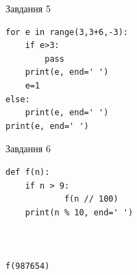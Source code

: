\documentclass[12pt, ukrainian]{article}
\begin{document}
{\vspace{15mm}
\begin{minipage}[t]{9.7cm}                
{\begin{center}Завдання {5}\end{center}}
\begin{verbatim}
for e in range(3,3+6,-3):
    if e>3:
        pass
    print(e, end=' ')
    e=1
else:
    print(e, end=' ')
print(e, end=' ')
\end{verbatim}     
\end{minipage}
\vline \hspace{8mm}
\begin{minipage}[t]{8.0cm}                
{\begin{center}Завдання {6}\end{center}}
\begin{verbatim}
def f(n):
    if n > 9:
            f(n // 100)
    print(n % 10, end=' ')
    


f(987654)
\end{verbatim}     
\end{minipage}

}
\newpage
\end{document}
